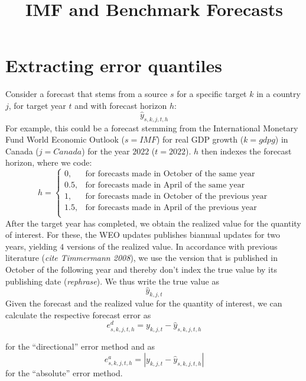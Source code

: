 \documentclass[
]{article}
\title{IMF and Benchmark Forecasts}
\author{}
\date{\vspace{-2.5em}}
\begin{document}
\maketitle

\hypertarget{extracting-error-quantiles}{%
\section{Extracting error quantiles}\label{extracting-error-quantiles}}

Consider a forecast that stems from a source \(s\) for a specific target \(k\) in a country \(j\), for target year \(t\) and with forecast horizon \(h\):
\[
\hat{y}_{s,k,j,t,h}
\]
For example, this could be a forecast stemming from the International Monetary Fund World Economic Outlook (\(s = IMF\)) for real GDP growth (\(k = gdpg\)) in Canada (\(j = Canada\)) for the year \(2022\) (\(t=2022\)). \(h\) then indexes the forecast horizon, where we code:
\[
h = \left\{
\begin{array}{ll} 
      0, & \textrm{for forecasts made in October of the same year} \\
      0.5, & \textrm{for forecasts made in April of the same year} \\
      1, & \textrm{for forecasts made in October of the previous year} \\
      1.5, & \textrm{for forecasts made in April of the previous year} \\
\end{array}\right. 
\]
After the target year has completed, we obtain the realized value for the quantity of interest. For these, the WEO updates publishes biannual updates for two years, yielding \(4\) versions of the realized value. In accordance with previous literature (\textit{cite Timmermann 2008}), we use the version that is published in October of the following year and thereby don't index the true value by its publishing date (\textit{rephrase}). We thus write the true value as
\[
\hat{y}_{k,j,t}
\]
Given the forecast and the realized value for the quantity of interest, we can calculate the respective forecast error as
\[
e^{d}_{s,k,j,t,h} = y_{k,j,t} - \hat{y}_{s,k,j,t,h}
\]

for the ``directional'' error method and as
\[
e^{a}_{s,k,j,t,h} = \left|y_{k,j,t} - \hat{y}_{s,k,j,t,h}\right|
\]
for the ``absolute'' error method.
\end{document}
